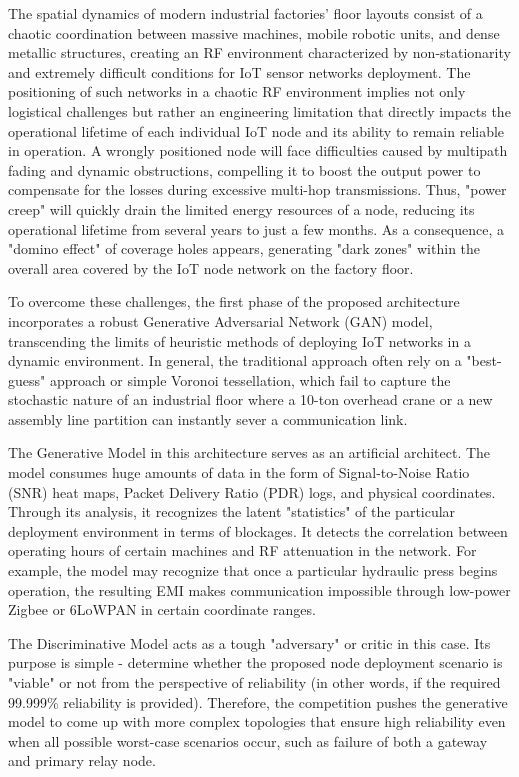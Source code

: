 \documentclass[a4paper,fleqn]{cas-dc}
\numberwithin{equation}{section}
\begin{document}
The spatial dynamics of modern industrial factories' floor layouts consist of a chaotic coordination between massive machines, mobile robotic units, and dense metallic structures, creating an RF environment characterized by non-stationarity and extremely difficult conditions for IoT sensor networks deployment. The positioning of such networks in a chaotic RF environment implies not only logistical challenges but rather an engineering limitation that directly impacts the operational lifetime of each individual IoT node and its ability to remain reliable in operation. A wrongly positioned node will face difficulties caused by multipath fading and dynamic obstructions, compelling it to boost the output power to compensate for the losses during excessive multi-hop transmissions. Thus, "power creep" will quickly drain the limited energy resources of a node, reducing its operational lifetime from several years to just a few months. As a consequence, a "domino effect" of coverage holes appears, generating "dark zones" within the overall area covered by the IoT node network on the factory floor.

To overcome these challenges, the first phase of the proposed architecture incorporates a robust Generative Adversarial Network (GAN) model, transcending the limits of heuristic methods of deploying IoT networks in a dynamic environment. In general, the traditional approach often rely on a "best-guess" approach or simple Voronoi tessellation, which fail to capture the stochastic nature of an industrial floor where a 10-ton overhead crane or a new assembly line partition can instantly sever a communication link. 

The Generative Model in this architecture serves as an artificial architect. The model consumes huge amounts of data in the form of Signal-to-Noise Ratio (SNR) heat maps, Packet Delivery Ratio (PDR) logs, and physical coordinates. Through its analysis, it recognizes the latent "statistics" of the particular deployment environment in terms of blockages. It detects the correlation between operating hours of certain machines and RF attenuation in the network. For example, the model may recognize that once a particular hydraulic press begins operation, the resulting EMI makes communication impossible through low-power Zigbee or 6LoWPAN in certain coordinate ranges.

The Discriminative Model acts as a tough "adversary" or critic in this case. Its purpose is simple - determine whether the proposed node deployment scenario is "viable" or not from the perspective of reliability (in other words, if the required 99.999\% reliability is provided). Therefore, the competition pushes the generative model to come up with more complex topologies that ensure high reliability even when all possible worst-case scenarios occur, such as failure of both a gateway and primary relay node.
\end{document}
